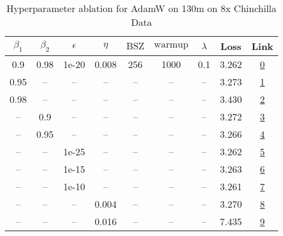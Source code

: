 \begin{table}[H]
\centering
\caption{Hyperparameter ablation for AdamW on 130m on 8x Chinchilla Data}
\label{tab:ablation_adamw_130m_8}
\begin{tabular}{ccccccccc}
\toprule
$\beta_1$ & $\beta_2$ & $\epsilon$ & $\eta$ & $\mathrm{BSZ}$ & $\mathrm{warmup}$ & $\lambda$ & Loss & Link \\
\midrule
0.9 & 0.98 & 1e-20 & 0.008 & 256 & 1000 & 0.1 & 3.262 & \href{https://wandb.ai/stanford-mercury/optimizer-scaling/runs/sweep-130m-21B-adamwc00703lr0.008-wd0.1-minlr0-warmup1000-b10.9--d73c2c}{0} \\
\midrule
0.95 & -- & -- & -- & -- & -- & -- & 3.273 & \href{https://wandb.ai/stanford-mercury/optimizer-scaling/runs/sweep-130m-21B-adamwd5d639lr0.008-wd0.1-minlr0-warmup1000-b10.95-658eb8}{1} \\
0.98 & -- & -- & -- & -- & -- & -- & 3.430 & \href{https://wandb.ai/stanford-mercury/optimizer-scaling/runs/sweep-130m-21B-adamw0cb2d6lr0.008-wd0.1-minlr0-warmup1000-b10.98-7c952d}{2} \\
-- & 0.9 & -- & -- & -- & -- & -- & 3.272 & \href{https://wandb.ai/stanford-mercury/optimizer-scaling/runs/sweep-130m-21B-adamwe479a6lr0.008-wd0.1-minlr0-warmup1000-b10.9--7570fe}{3} \\
-- & 0.95 & -- & -- & -- & -- & -- & 3.266 & \href{https://wandb.ai/stanford-mercury/optimizer-scaling/runs/sweep-130m-21B-adamw63b609lr0.008-wd0.1-minlr0-warmup1000-b10.9--2da2b5}{4} \\
-- & -- & 1e-25 & -- & -- & -- & -- & 3.262 & \href{https://wandb.ai/stanford-mercury/optimizer-scaling/runs/sweep-130m-21B-adamwc0b69dlr0.008-wd0.1-minlr0-warmup1000-b10.9--2390cc}{5} \\
-- & -- & 1e-15 & -- & -- & -- & -- & 3.263 & \href{https://wandb.ai/stanford-mercury/optimizer-scaling/runs/sweep-130m-21B-adamw9248c1lr0.008-wd0.1-minlr0-warmup1000-b10.9--7ae1a8}{6} \\
-- & -- & 1e-10 & -- & -- & -- & -- & 3.261 & \href{https://wandb.ai/stanford-mercury/optimizer-scaling/runs/sweep-130m-21B-adamw357d4clr0.008-wd0.1-minlr0-warmup1000-b10.9--27bdc1}{7} \\
-- & -- & -- & 0.004 & -- & -- & -- & 3.270 & \href{https://wandb.ai/stanford-mercury/optimizer-scaling/runs/sweep-130m-21B-adamwdb2f39lr0.004-wd0.1-minlr0-warmup1000-b10.9--cf39b6}{8} \\
-- & -- & -- & 0.016 & -- & -- & -- & 7.435 & \href{https://wandb.ai/stanford-mercury/optimizer-scaling/runs/sweep-130m-21B-adamw06731clr0.016-wd0.1-minlr0-warmup1000-b10.9--2664a6}{9} \\

\end{tabular}
\end{table}
